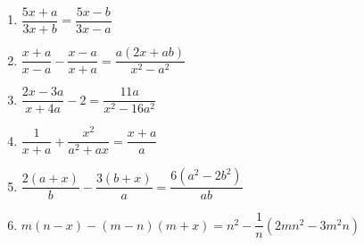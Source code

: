 \documentclass{article}
\begin{document}
\begin{enumerate}[label=\bfseries\small 144.\arabic*, itemsep=3cm]
\item $\dfrac{5x+a}{3x+b} = \dfrac{5x-b}{3x-a}$

\item $\dfrac{x+a}{x-a} - \dfrac{x-a}{x+a} = \dfrac{a(2x+ab)}{x^2-a^2}$

\item $\dfrac{2x - 3a}{x + 4a} - 2 = \dfrac{11a}{x^2 - 16a^2}$

\item $\dfrac{1}{x + a} + \dfrac{x^2}{a^2 + ax} = \dfrac{x + a}{a}$

\item $\dfrac{2(a + x)}{b} - \dfrac{3(b + x)}{a} = \dfrac{6(a^2 - 2b^2)}{ab}$

\item $m(n - x) - (m - n)(m + x) = n^2 - \dfrac{1}{n}(2mn^2 - 3m^2n)$

\end{enumerate}
\end{document}

